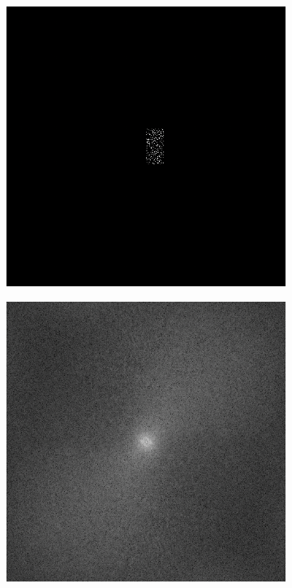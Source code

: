 \begin{figure}[!ht]
\centering
  \begin{subfigure}{0.24\textwidth}
    \includegraphics[width=\linewidth]{img/ch6/leopard_chosen_frequencies.png}
    \caption{} \label{fig:1a}
  \end{subfigure}
  \begin{subfigure}{0.24\textwidth}
    \includegraphics[width=\linewidth]{img/ch6/leopard_generated_frequencies.png}

\end{subfigure}
\end{figure}
